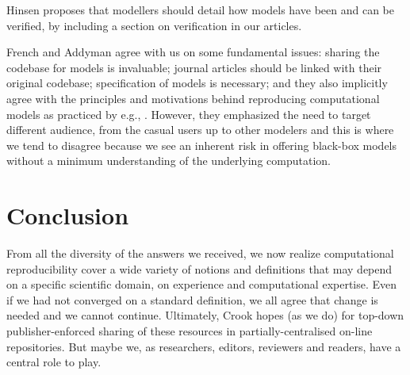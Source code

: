 \documentclass[jou]{apa6}
\begin{document}
Hinsen proposes that modellers should detail how models have been and can be verified, by including a section on verification in our articles.

French and Addyman agree with us on some fundamental issues: sharing the codebase for models is invaluable; journal articles should be linked with their original codebase; specification of models is necessary; and they also implicitly agree with the principles and motivations behind reproducing computational models as practiced by e.g., . However, they
emphasized the need to target different audience, from the casual users up to other modelers and this is where we tend to disagree because we see an inherent risk in offering black-box models without a minimum understanding of the underlying computation.


\section{Conclusion}

From all the diversity of the answers we received, we now realize computational reproducibility cover a wide variety of notions and definitions that may depend on a specific scientific domain, on experience and computational expertise. 
Even if we had not converged on a standard definition, we all agree that change is needed and we cannot continue.
Ultimately, Crook hopes (as we do) for top-down publisher-enforced sharing of these resources in partially-centralised on-line repositories.
But maybe we, as researchers, editors, reviewers and readers, have a central role to play.



\end{document}
